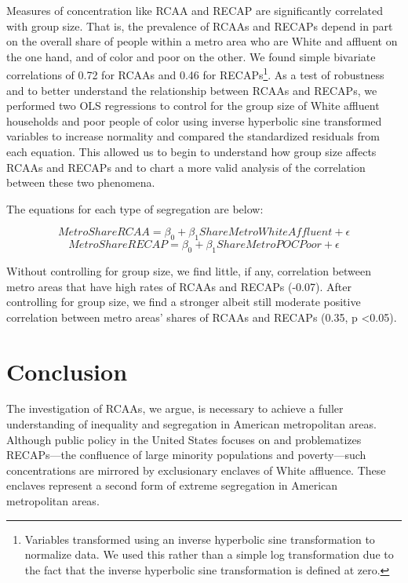 \documentclass[11pt,]{article}
\begin{document}
Measures of concentration like RCAA and RECAP are significantly
correlated with group size. That is, the prevalence of RCAAs and RECAPs
depend in part on the overall share of people within a metro area who
are White and affluent on the one hand, and of color and poor on the
other. We found simple bivariate correlations of 0.72 for RCAAs and 0.46
for RECAPs\footnote{Variables transformed using an inverse hyperbolic
  sine transformation to normalize data. We used this rather than a
  simple log transformation due to the fact that the inverse hyperbolic
  sine transformation is defined at zero.}. As a test of robustness and
to better understand the relationship between RCAAs and RECAPs, we
performed two OLS regressions to control for the group size of White
affluent households and poor people of color using inverse hyperbolic
sine transformed variables to increase normality and compared the
standardized residuals from each equation. This allowed us to begin to
understand how group size affects RCAAs and RECAPs and to chart a more
valid analysis of the correlation between these two phenomena.

The equations for each type of segregation are below:

\[ MetroShareRCAA = \beta_0 + \beta_1ShareMetroWhiteAffluent + \epsilon \]
\[ MetroShareRECAP = \beta_0 + \beta_1ShareMetroPOCPoor + \epsilon \]

Without controlling for group size, we find little, if any, correlation
between metro areas that have high rates of RCAAs and RECAPs (-0.07).
After controlling for group size, we find a stronger albeit still
moderate positive correlation between metro areas' shares of RCAAs and
RECAPs (0.35, p \textless{}0.05).

\hypertarget{conclusion}{%
\section{Conclusion}\label{conclusion}}

The investigation of RCAAs, we argue, is necessary to achieve a fuller
understanding of inequality and segregation in American metropolitan
areas. Although public policy in the United States focuses on and
problematizes RECAPs---the confluence of large minority populations and
poverty---such concentrations are mirrored by exclusionary enclaves of
White affluence. These enclaves represent a second form of extreme
segregation in American metropolitan areas.
\end{document}
